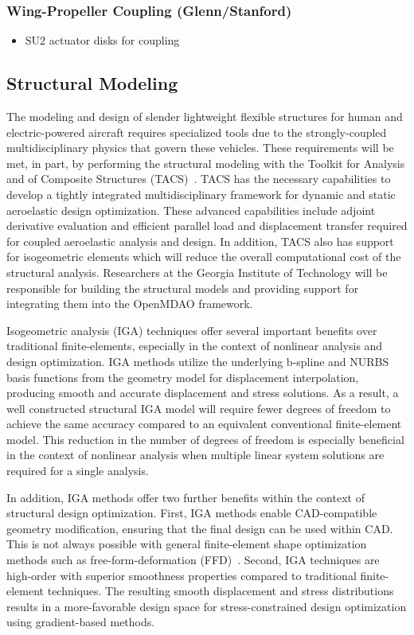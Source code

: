 \documentclass[]{aiaa-tc}
\begin{document}
    \subsubsection{Wing-Propeller Coupling (Glenn/Stanford)}
        \begin{itemize}
            \item SU2 actuator disks for coupling
        \end{itemize}

        \subsection{Structural Modeling}

The modeling and design of slender lightweight flexible structures for
human and electric-powered aircraft requires specialized tools due to
the strongly-coupled multidisciplinary physics that govern these
vehicles. These requirements will be met, in part, by performing the
structural modeling with the Toolkit for Analysis and of Composite
Structures (TACS)~\cite{Kennedy:2014:TACS,
  Kennedy:2014:tacs-tripan}. TACS has the necessary capabilities to
develop a tightly integrated multidisciplinary framework for dynamic
and static aeroelastic design optimization. These advanced
capabilities include adjoint derivative evaluation and efficient
parallel load and displacement transfer required for coupled
aeroelastic analysis and design.  In addition, TACS also has support
for isogeometric elements which will reduce the overall computational
cost of the structural analysis. Researchers at the Georgia Institute
of Technology will be responsible for building the structural models
and providing support for integrating them into the OpenMDAO
framework.

Isogeometric analysis (IGA) techniques offer several important
benefits over traditional finite-elements, especially in the context
of nonlinear analysis and design optimization. IGA methods utilize the
underlying b-spline and NURBS basis functions from the geometry model
for displacement interpolation, producing smooth and accurate
displacement and stress solutions. As a result, a well constructed
structural IGA model will require fewer degrees of freedom to achieve
the same accuracy compared to an equivalent conventional
finite-element model. This reduction in the number of degrees of
freedom is especially beneficial in the context of nonlinear analysis
when multiple linear system solutions are required for a single
analysis. 

In addition, IGA methods offer two further benefits within the context
of structural design optimization. First, IGA methods enable
CAD-compatible geometry modification, ensuring that the final design
can be used within CAD. This is not always possible with general
finite-element shape optimization methods such as
free-form-deformation (FFD)~\cite{Sederberg:1986:FFD,
  Kenway:2010:CAD}.  Second, IGA techniques are high-order with
superior smoothness properties compared to traditional finite-element
techniques. The resulting smooth displacement and stress distributions
results in a more-favorable design space for stress-constrained design
optimization using gradient-based methods.
\end{document}

